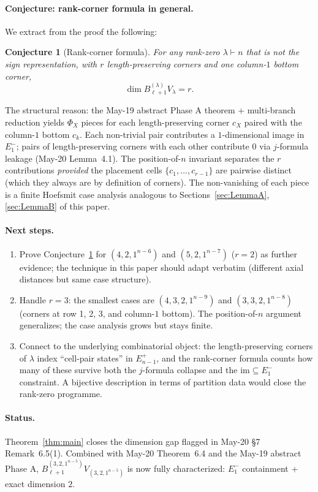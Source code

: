 \documentclass[11pt]{article}
\newtheorem{conjecture}[theorem]{Conjecture}
\theoremstyle{definition}
\begin{document}
\paragraph{Conjecture: rank-corner formula in general.}
We extract from the proof the following:

\begin{conjecture}[Rank-corner formula]\label{conj:rank-corner}
For any rank-zero $\lambda \vdash n$ that is not the sign
representation, with $r$ length-preserving corners and one
column-$1$ bottom corner,
\[
   \dim B_{\ell+1}^{(\lambda)} V_\lambda = r.
\]
\end{conjecture}

The structural reason: the May-19 abstract Phase A theorem +
multi-branch reduction yields $\Phi_X$ pieces for each
length-preserving corner $c_X$ paired with the column-$1$ bottom
$c_k$. Each non-trivial pair contributes a $1$-dimensional image
in $E_1^-$; pairs of length-preserving corners with each other
contribute $0$ via $j$-formula leakage (May-20 Lemma~4.1). The
position-of-$n$ invariant separates the $r$ contributions
\emph{provided} the placement cells $\{c_1, \ldots, c_{r-1}\}$ are
pairwise distinct (which they always are by definition of
corners). The non-vanishing of each piece is a finite Hoefsmit
case analysis analogous to Sections~\ref{sec:LemmaA},
\ref{sec:LemmaB} of this paper.

\paragraph{Next steps.}
\begin{enumerate}[leftmargin=2em,topsep=0.3em,itemsep=0.2em,label=(\arabic*)]
\item Prove Conjecture~\ref{conj:rank-corner} for $(4, 2, 1^{n-6})$
and $(5, 2, 1^{n-7})$ ($r = 2$) as further evidence; the technique
in this paper should adapt verbatim (different axial distances but
same case structure).
\item Handle $r = 3$: the smallest cases are $(4, 3, 2, 1^{n-9})$
and $(3, 3, 2, 1^{n-8})$ (corners at row 1, 2, 3, and column-$1$
bottom). The position-of-$n$ argument generalizes; the case
analysis grows but stays finite.
\item Connect to the underlying combinatorial object: the
length-preserving corners of $\lambda$ index ``cell-pair states''
in $E_{n-1}^+$, and the rank-corner formula counts how many of
these survive both the $j$-formula collapse and the $\mathrm{im}\subseteq E_1^-$
constraint. A bijective description in terms of partition data
would close the rank-zero programme.
\end{enumerate}

\paragraph{Status.} Theorem~\ref{thm:main} closes the dimension gap
flagged in May-20 \S 7 Remark~6.5(1). Combined with May-20
Theorem~6.4 and the May-19 abstract Phase A,
$B_{\ell+1}^{(3, 2, 1^{n-5})} V_{(3, 2, 1^{n-5})}$ is now fully
characterized: $E_1^-$ containment + exact dimension $2$.
\end{document}
